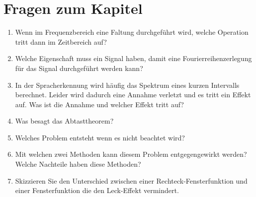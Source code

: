 \section{Fragen zum Kapitel}
\begin{enumerate}
	\item Wenn im Frequenzbereich eine Faltung durchgeführt wird, welche Operation tritt dann im Zeitbereich auf?
	\item Welche Eigenschaft muss ein Signal haben, damit eine Fourierreihenzerlegung für das Signal durchgeführt werden kann?

	\item In der Spracherkennung wird häufig das Spektrum eines kurzen Intervalls berechnet. Leider wird dadurch eine Annahme verletzt und es tritt ein Effekt auf. Was ist die Annahme und welcher Effekt tritt auf?
	\item Was besagt das Abtasttheorem?
	\item Welches Problem entsteht wenn es nicht beachtet wird?
	\item Mit welchen zwei Methoden kann diesem Problem entgegengewirkt werden? Welche Nachteile haben diese Methoden?
	\item Skizzieren Sie den Unterschied zwischen einer Rechteck-Fensterfunktion und einer Fensterfunktion die den Leck-Effekt vermindert.
\end{enumerate}

\textit{}